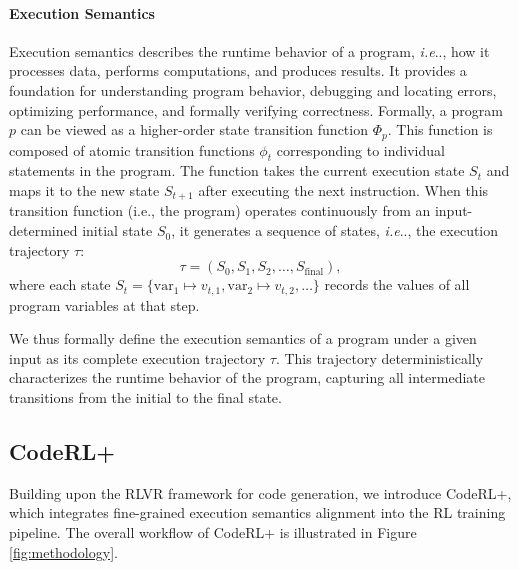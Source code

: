 \documentclass{article}
\makeatletter
\DeclareRobustCommand\onedot{\futurelet\@let@token\@onedot}
\def\@onedot{\ifx\@let@token.\else.\null\fi\xspace}
\def\ie{\emph{i.e}\onedot} \def\Ie{\emph{i.e}\onedot}
\DeclareRobustCommand{\ourapproach}{{\sc CodeRL+}\xspace}
\theoremstyle{definition}
\theoremstyle{remark}
\makeatother
\begin{document}
\paragraph{Execution Semantics}
Execution semantics describes the runtime behavior of a program, \ie, how it processes data, performs computations, and produces results. It provides a foundation for understanding program behavior, debugging and locating errors, optimizing performance, and formally verifying correctness. Formally, a program $p$ can be viewed as a higher-order state transition function $\Phi_p$. This function is composed of atomic transition functions $\phi_t$ corresponding to individual statements in the program. The function takes the current execution state $S_t$ and maps it to the new state $S_{t+1}$ after executing the next instruction.
When this transition function (i.e., the program) operates continuously from an input-determined initial state $S_0$, it generates a sequence of states, \ie, the execution trajectory $\tau$:
\begin{equation}
    \tau = (S_0, S_1, S_2, \dots, S_{\text{final}}),
\end{equation}
where each state $S_t = \{\text{var}_1 \mapsto v_{t,1}, \text{var}_2 \mapsto v_{t,2}, \dots\}$ records the values of all program variables at that step.

We thus formally define the execution semantics of a program under a given input as its complete execution trajectory $\tau$. This trajectory deterministically characterizes the runtime behavior of the program, capturing all intermediate transitions from the initial to the final state.


\subsection{\ourapproach}
Building upon the RLVR framework for code generation, we introduce \ourapproach, which integrates fine-grained execution semantics alignment into the RL training pipeline. The overall workflow of \ourapproach is illustrated in Figure \ref{fig:methodology}.
\end{document}
